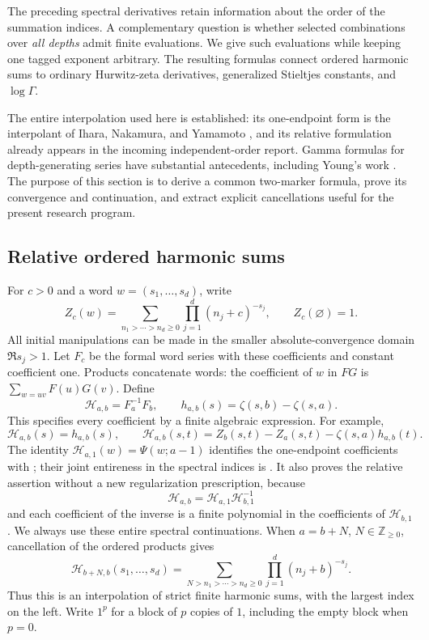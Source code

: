 \documentclass[11pt,a4paper]{article}
\numberwithin{equation}{section}
\theoremstyle{definition}
\theoremstyle{remark}
\newcommand{\Hrel}{\mathcal H}
\begin{document}
The preceding spectral derivatives retain information about the order of
the summation indices.  A complementary question is whether selected
combinations over \emph{all depths} admit finite evaluations.  We give
such evaluations while keeping one tagged exponent arbitrary.  The
resulting formulas connect ordered harmonic sums to ordinary Hurwitz-zeta
derivatives, generalized Stieltjes constants, and $\log\Gamma$.

The entire interpolation used here is established: its one-endpoint
form is the interpolant of Ihara, Nakamura, and Yamamoto
\cite{INY}, and its relative formulation already appears in the
incoming independent-order report.  Gamma formulas for depth-generating
series have substantial antecedents, including Young's work
\cite{Young}.  The purpose of this section is to derive a common
two-marker formula, prove its convergence and continuation, and extract
explicit cancellations useful for the present research program.

\subsection{Relative ordered harmonic sums}

For $c>0$ and a word $w=(s_1,\ldots,s_d)$, write
\[
 Z_c(w)=\sum_{n_1>\cdots>n_d\ge0}
              \prod_{j=1}^d(n_j+c)^{-s_j},
 \qquad Z_c(\varnothing)=1.
\]
All initial manipulations can be made in the smaller absolute-convergence
domain $\Re s_j>1$.  Let $F_c$ be the formal word series with these
coefficients and constant coefficient one.  Products concatenate words:
the coefficient of $w$ in $FG$ is $\sum_{w=uv}F(u)G(v)$.  Define
\begin{equation}\label{ord:relative}
             \Hrel_{a,b}=F_a^{-1}F_b,\qquad
             h_{a,b}(s)=\zeta(s,b)-\zeta(s,a).
\end{equation}
This specifies every coefficient by a finite algebraic expression.  For
example,
\[
 \Hrel_{a,b}(s)=h_{a,b}(s),\qquad
 \Hrel_{a,b}(s,t)=Z_b(s,t)-Z_a(s,t)-\zeta(s,a)h_{a,b}(t).
\]
The identity $\Hrel_{a,1}(w)=\Psi(w;a-1)$ identifies the one-endpoint
coefficients with \cite[Proposition~2.1]{INY}; their joint entireness in
the spectral indices is \cite[Corollary~4.2]{INY}.  It also proves the
relative assertion without a new regularization prescription, because
\[
                 \Hrel_{a,b}=\Hrel_{a,1}\Hrel_{b,1}^{-1}
\]
and each coefficient of the inverse is a finite polynomial in the
coefficients of $\Hrel_{b,1}$.  We always use these entire spectral continuations.
When $a=b+N$, $N\in\mathbb Z_{\ge0}$, cancellation of the ordered products
gives
\begin{equation}\label{ord:finite}
 \Hrel_{b+N,b}(s_1,\ldots,s_d)
   =\sum_{N>n_1>\cdots>n_d\ge0}
             \prod_{j=1}^d(n_j+b)^{-s_j}.
\end{equation}
Thus this is an interpolation of strict finite harmonic sums, with the
largest index on the left.  Write $1^p$ for a block of $p$ copies of $1$,
including the empty block when $p=0$.
\end{document}
